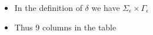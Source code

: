 \begin{frame}[allowframebreaks]
\begin{itemize}
\item In the definition of $\delta$ we have
  $\Sigma_\epsilon \times \Gamma_\epsilon$
\item [] Thus 9 columns in the table

\end{itemize}\end{frame}



